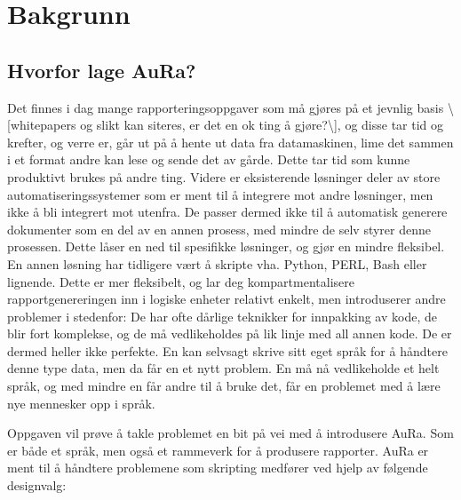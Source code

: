 \documentclass[11pt]{article}
\begin{document}



\section{Bakgrunn}



\subsection{Hvorfor lage AuRa?}
Det finnes i dag mange rapporteringsoppgaver som må gjøres på et jevnlig basis \textbackslash [whitepapers og slikt kan siteres, er det en ok ting å gjøre?\textbackslash ], og disse tar tid og krefter, og verre er, går ut på å hente ut data fra datamaskinen, lime det sammen i et format andre kan lese og sende det av gårde.
Dette tar tid som kunne produktivt brukes på andre ting. Videre er eksisterende løsninger deler av store automatiseringssystemer som er ment til å integrere mot andre løsninger, men ikke å bli integrert mot utenfra. De passer dermed ikke til å automatisk generere dokumenter som en del av en annen prosess, med mindre de selv styrer denne prosessen. Dette låser en ned til spesifikke løsninger, og gjør en mindre fleksibel. En annen løsning har tidligere vært å skripte vha. Python, PERL, Bash eller lignende. Dette er mer fleksibelt, og lar deg kompartmentalisere rapportgenereringen inn i logiske enheter relativt enkelt, men introduserer andre problemer i stedenfor: De har ofte dårlige teknikker for innpakking av kode, de blir fort komplekse, og de må vedlikeholdes på lik linje med all annen kode. De er dermed heller ikke perfekte. En kan selvsagt skrive sitt eget språk for å håndtere denne type data, men da får en et nytt problem. En må nå vedlikeholde et helt språk, og med mindre en får andre til å bruke det, får en problemet med å lære nye mennesker opp i språk.



Oppgaven vil prøve å takle problemet en bit på vei med å introdusere AuRa. Som er både et språk, men også et rammeverk for å produsere rapporter. AuRa er ment til å håndtere problemene som skripting medfører ved hjelp av følgende designvalg:
\end{document}
